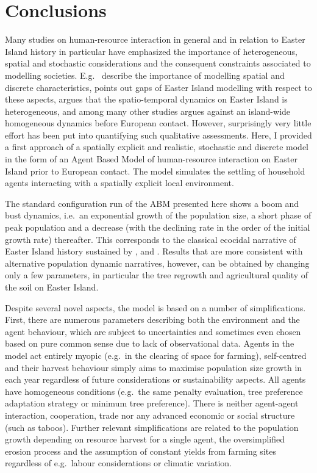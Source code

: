 
\chapter{Conclusions}

Many studies on human-resource interaction in general and in relation to Easter Island history in particular have emphasized the importance of heterogeneous, spatial and stochastic considerations and the consequent constraints associated to modelling societies.
E.g.\ \citet{Bousquet2004} describe the importance of modelling spatial and discrete characteristics, \citet{Merico2017} points out gaps of Easter Island modelling with respect to these aspects, \citet{Rull2020} argues that the spatio-temporal dynamics on Easter Island is heterogeneous, and \citet{Stevenson2015} among many other studies argues against an island-wide homogeneous dynamics before European contact.
However, surprisingly very little effort has been put into quantifying such qualitative assessments.
Here, I provided a first approach of a spatially explicit and realistic, stochastic and discrete model in the form of an Agent Based Model of human-resource interaction on Easter Island prior to European contact. The model simulates the settling of household agents interacting with a spatially explicit local environment. 

The standard configuration run of the ABM presented here shows a boom and bust dynamics, i.e.\ an exponential growth of the population size, a short phase of peak population and a decrease (with the declining rate in the order of the initial growth rate) thereafter.
This corresponds to the classical ecocidal narrative of Easter Island history sustained by \citet{Brander1998}, \citet{Diamond2011} and \citet{Bahn2017}.
Results that are more consistent with alternative population dynamic narratives, however, can be obtained by changing only a few parameters, in particular the tree regrowth and agricultural quality of the soil on Easter Island.

Despite several novel aspects, the model is based on a number of simplifications.
First, there are numerous parameters describing both the environment and the agent behaviour, which are subject to uncertainties and sometimes even chosen based on pure common sense due to lack of observational data.
Agents in the model act entirely myopic (e.g.\ in the clearing of space for farming), self-centred and their harvest behaviour simply aims to maximise population size growth in each year regardless of future considerations or sustainability aspects. 
All agents have homogeneous conditions (e.g.\ the same penalty evaluation, tree preference adaptation strategy or minimum tree preference).
There is neither agent-agent interaction, cooperation, trade nor any advanced economic or social structure (such as taboos). 
Further relevant simplifications are related to the population growth depending on resource harvest for a single agent, the oversimplified erosion process and the assumption of constant yields from farming sites regardless of e.g.\ labour considerations or climatic variation.

